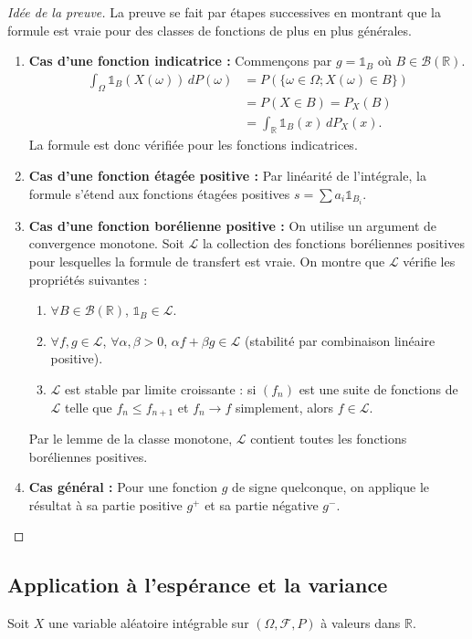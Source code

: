 \begin{proof}[Idée de la preuve]
La preuve se fait par étapes successives en montrant que la formule est vraie pour des classes de fonctions de plus en plus générales.
\begin{enumerate}
    \item \textbf{Cas d'une fonction indicatrice :} Commençons par $g = \mathbb{1}_B$ où $B \in \mathcal{B}(\mathbb{R})$.
    \begin{align*}
    \int_{\Omega} \mathbb{1}_B(X(\omega)) \,dP(\omega) &= P(\{\omega \in \Omega; X(\omega) \in B\}) \\
    &= P(X \in B) = P_X(B) \\
    &= \int_{\mathbb{R}} \mathbb{1}_B(x) \,dP_X(x).
    \end{align*}
    La formule est donc vérifiée pour les fonctions indicatrices.
    \item \textbf{Cas d'une fonction étagée positive :} Par linéarité de l'intégrale, la formule s'étend aux fonctions étagées positives $s = \sum a_i \mathbb{1}_{B_i}$.
    \item \textbf{Cas d'une fonction borélienne positive :} On utilise un argument de convergence monotone. Soit $\mathcal{L}$ la collection des fonctions boréliennes positives pour lesquelles la formule de transfert est vraie. On montre que $\mathcal{L}$ vérifie les propriétés suivantes :
    \begin{enumerate}
        \item[(i)] $\forall B \in \mathcal{B}(\mathbb{R})$, $\mathbb{1}_B \in \mathcal{L}$.
        \item[(ii)] $\forall f,g \in \mathcal{L}$, $\forall \alpha, \beta > 0$, $\alpha f + \beta g \in \mathcal{L}$ (stabilité par combinaison linéaire positive).
        \item[(iii)] $\mathcal{L}$ est stable par limite croissante : si $(f_n)$ est une suite de fonctions de $\mathcal{L}$ telle que $f_n \le f_{n+1}$ et $f_n \to f$ simplement, alors $f \in \mathcal{L}$.
    \end{enumerate}
    Par le lemme de la classe monotone, $\mathcal{L}$ contient toutes les fonctions boréliennes positives.
    \item \textbf{Cas général :} Pour une fonction $g$ de signe quelconque, on applique le résultat à sa partie positive $g^+$ et sa partie négative $g^-$.
\end{enumerate}
\end{proof}
\subsection{Application à l'espérance et la variance}
Soit $X$ une variable aléatoire intégrable sur $(\Omega, \mathcal{F}, P)$ à valeurs dans $\mathbb{R}$.
